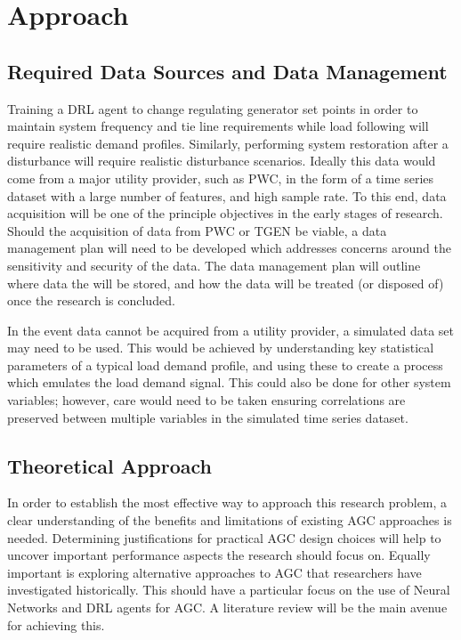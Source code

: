 \section{Approach}

\subsection{Required Data Sources and Data Management}\label{datamanagement}
Training a DRL agent to change regulating generator set points in order to maintain system frequency and tie line requirements while load following will require realistic demand profiles. Similarly, performing system restoration after a disturbance will require realistic disturbance scenarios. Ideally this data would come from a major utility provider, such as PWC, in the form of a time series dataset with a large number of features, and high sample rate. To this end, data acquisition will be one of the principle objectives in the early stages of research. Should the acquisition of data from PWC or TGEN be viable, a data management plan will need to be developed which addresses concerns around the sensitivity and security of the data. The data management plan will outline where data the will be stored, and how the data will be treated (or disposed of) once the research is concluded.

In the event data cannot be acquired from a utility provider, a simulated data set may need to be used. This would be achieved by understanding key statistical parameters of a typical load demand profile, and using these to create a process which emulates the load demand signal. This could also be done for other system variables; however, care would need to be taken ensuring correlations are preserved between multiple variables in the simulated time series dataset.

\subsection{Theoretical Approach}
In order to establish the most effective way to approach this research problem, a clear understanding of the benefits and limitations of existing AGC approaches is needed. Determining justifications for practical AGC design choices will help to uncover important performance aspects the research should focus on. Equally important is exploring alternative approaches to AGC that researchers have investigated historically. This should have a particular focus on the use of Neural Networks and DRL agents for AGC. A literature review will be the main avenue for achieving this.

